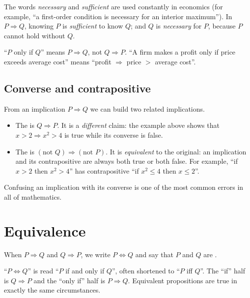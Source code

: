 The words \emph{necessary} and \emph{sufficient} are used constantly in economics (for example,
``a first-order condition is necessary for an interior maximum''). In $P\Rightarrow Q$, knowing $P$ is
\emph{sufficient} to know $Q$; and $Q$ is \emph{necessary} for $P$, because $P$ cannot hold without $Q$.

\begin{warning}
``$P$ only if $Q$'' means $P\Rightarrow Q$, not $Q\Rightarrow P$. ``A firm makes a profit only if
price exceeds average cost'' means ``profit $\Rightarrow$ price $>$ average cost''.
\end{warning}

\subsection{Converse and contrapositive}

\begin{external}
From an implication $P\Rightarrow Q$ we can build two related implications.
\begin{itemize}
  \item The  is $Q\Rightarrow P$. It is a \emph{different} claim: the example above
  shows that $x>2\Rightarrow x^2>4$ is true while its converse is false.
  \item The  is $(\text{not }Q)\Rightarrow(\text{not }P)$. It is \emph{equivalent}
  to the original: an implication and its contrapositive are always both true or both false. For
  example, ``if $x>2$ then $x^2>4$'' has contrapositive ``if $x^2\le 4$ then $x\le 2$''.
\end{itemize}
Confusing an implication with its converse is one of the most common errors in all of mathematics.
\end{external}

\section{Equivalence}\label{sec:equivalence}

\begin{definition}
When $P\Rightarrow Q$ and $Q\Rightarrow P$, we write $P\Leftrightarrow Q$ and say that $P$ and $Q$ are
. 
\end{definition}

``$P\Leftrightarrow Q$'' is read ``$P$ if and only if $Q$'', often shortened to ``$P$ iff $Q$''. The
``if'' half is $Q\Rightarrow P$ and the ``only if'' half is $P\Rightarrow Q$. Equivalent propositions are
true in exactly the same circumstances.

